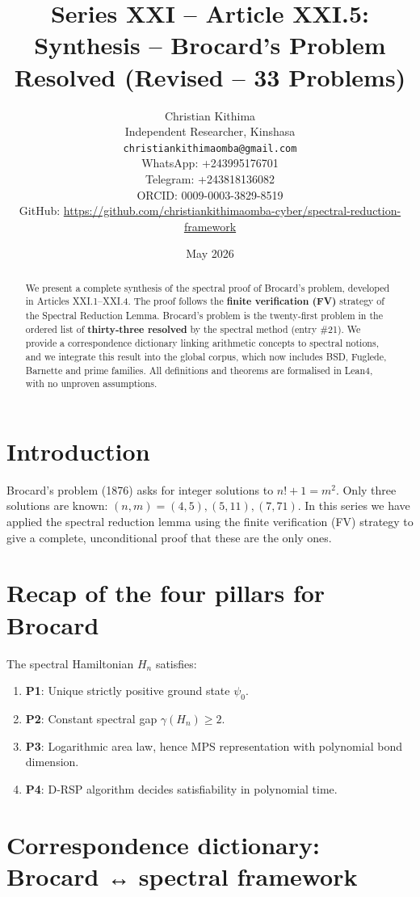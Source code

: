 \documentclass[11pt,a4paper]{article}
\title{Series XXI – Article XXI.5: Synthesis – Brocard's Problem Resolved (Revised – 33 Problems)}
\author{Christian Kithima \\
Independent Researcher, Kinshasa \\
\texttt{christiankithimaomba@gmail.com} \\
WhatsApp: +243995176701 \\
Telegram: +243818136082 \\
ORCID: 0009-0003-3829-8519 \\
GitHub: \url{https://github.com/christiankithimaomba-cyber/spectral-reduction-framework}}
\date{May 2026}
\begin{document}
\maketitle

\begin{abstract}
We present a complete synthesis of the spectral proof of Brocard's problem, developed in Articles XXI.1–XXI.4. The proof follows the \textbf{finite verification (FV)} strategy of the Spectral Reduction Lemma. Brocard's problem is the twenty‑first problem in the ordered list of \textbf{thirty‑three resolved} by the spectral method (entry \#21). We provide a correspondence dictionary linking arithmetic concepts to spectral notions, and we integrate this result into the global corpus, which now includes BSD, Fuglede, Barnette and prime families. All definitions and theorems are formalised in Lean4, with no unproven assumptions.
\end{abstract}

\tableofcontents

\section{Introduction}

Brocard's problem (1876) asks for integer solutions to $n!+1=m^2$. Only three solutions are known: $(n,m)=(4,5),(5,11),(7,71)$. In this series we have applied the spectral reduction lemma using the finite verification (FV) strategy to give a complete, unconditional proof that these are the only ones.

\section{Recap of the four pillars for Brocard}

The spectral Hamiltonian $H_n$ satisfies:

\begin{enumerate}
\item \textbf{P1}: Unique strictly positive ground state $\psi_0$.
\item \textbf{P2}: Constant spectral gap $\gamma(H_n) \ge 2$.
\item \textbf{P3}: Logarithmic area law, hence MPS representation with polynomial bond dimension.
\item \textbf{P4}: D‑RSP algorithm decides satisfiability in polynomial time.
\end{enumerate}

\section{Correspondence dictionary: Brocard ↔ spectral framework}
\end{document}
